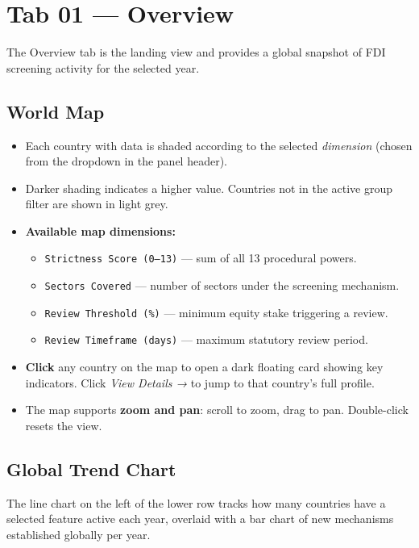 \documentclass[12pt,a4paper]{article}
\newcommand{\uielem}[1]{\textit{#1}}
\newcommand{\fieldname}[1]{\texttt{\small#1}}
\begin{document}
\section{Tab 01 — Overview}
\label{sec:overview-tab}

The Overview tab is the landing view and provides a global snapshot of FDI screening activity for the selected year.

\subsection{World Map}

\begin{itemize}
  \item Each country with data is shaded according to the selected \uielem{dimension} (chosen from the dropdown in the panel header).
  \item Darker shading indicates a higher value. Countries not in the active group filter are shown in light grey.
  \item \textbf{Available map dimensions:}
    \begin{itemize}
      \item \fieldname{Strictness Score (0–13)} — sum of all 13 procedural powers.
      \item \fieldname{Sectors Covered} — number of sectors under the screening mechanism.
      \item \fieldname{Review Threshold (\%)} — minimum equity stake triggering a review.
      \item \fieldname{Review Timeframe (days)} — maximum statutory review period.
    \end{itemize}
  \item \textbf{Click} any country on the map to open a dark floating card showing key indicators. Click \uielem{View Details →} to jump to that country's full profile.
  \item The map supports \textbf{zoom and pan}: scroll to zoom, drag to pan. Double-click resets the view.
\end{itemize}

\subsection{Global Trend Chart}

The line chart on the left of the lower row tracks how many countries have a selected feature active each year, overlaid with a bar chart of new mechanisms established globally per year.
\end{document}
